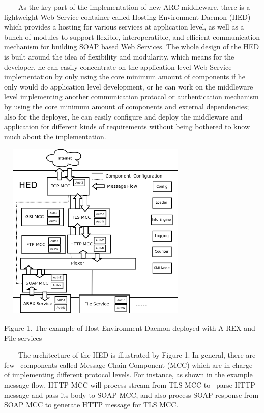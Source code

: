 \documentclass{article}
\begin{document}
\ \ \ \ As the key part of the implementation of new ARC middleware,
there is a lightweight Web Service container called Hosting Environment
Daemon (HED) which provides a hosting for various services at
application level, as well as a bunch of modules to support flexible,
interoperatible, and efficient communication mechanism for building
SOAP based Web Services. The whole design of the HED is built around
the idea of flexibility and modularity, which means for the developer,
he can easily concentrate on the application level Web Service
implementation by only using the core minimum amount of components if
he only would do application level development, or he can work on the
middleware level implementing another communication protocol or
authentication mechanism by using the core minimum amount of components
and external dependencies; also for the deployer, he can easily
configure and deploy the middleware and application for different kinds
of requirements without being bothered to know much about the
implementation.



\begin{center}
\includegraphics[width=3.7465in,height=3.3764in]{Secpaper-img1.png}
\end{center}

\bigskip

{\centering
Figure 1. The example of Host Environment Daemon deployed with A-REX and
File services
\par}

\ \ \ \ The architecture of the HED is illustrated by Figure 1. In
general, there are few \ components called Message Chain Component
(MCC) which are in charge of implementing different protocol levels.
For instance, as shown in the example message flow, HTTP MCC will
process stream from TLS MCC to \ parse HTTP message and pass its body
to SOAP MCC, and also process SOAP response from SOAP MCC to generate
HTTP message for TLS MCC. 
\end{document}
